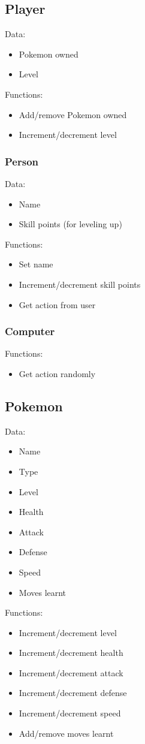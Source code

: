 \documentclass{article}
\begin{document}
  \subsection{Player}
  Data: 
  \begin{itemize}
    \item Pokemon owned
    \item Level 
  \end{itemize}
  Functions:
  \begin{itemize}
    \item Add/remove Pokemon owned
    \item Increment/decrement level
  \end{itemize}
  
  \subsubsection{Person}
  Data:
  \begin{itemize}
    \item Name
    \item Skill points (for leveling up)
  \end{itemize}
  Functions:
  \begin{itemize}
    \item Set name
    \item Increment/decrement skill points
    \item Get action from user
  \end{itemize}
  
  \subsubsection{Computer}
  Functions:
  \begin{itemize}
    \item Get action randomly
  \end{itemize}
    
  \subsection{Pokemon}
  Data:
  \begin{itemize}
    \item Name
    \item Type
    \item Level
    \item Health
    \item Attack
    \item Defense
    \item Speed
    \item Moves learnt
  \end{itemize}
  Functions:
  \begin{itemize}
    \item Increment/decrement level
    \item Increment/decrement health
    \item Increment/decrement attack
    \item Increment/decrement defense
    \item Increment/decrement speed
    \item Add/remove moves learnt
  \end{itemize}
  
\end{document}
